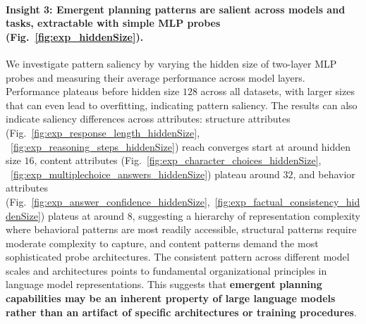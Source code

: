 \paragraph{Insight 3: Emergent planning patterns are salient across models and tasks, extractable with simple MLP probes (Fig.~\ref{fig:exp_hiddenSize}).}
We investigate pattern saliency by varying the hidden size of two-layer MLP probes and measuring their average performance across model layers. Performance plateaus before hidden size $128$ across all datasets, with larger sizes that can even lead to overfitting, indicating pattern saliency. 
The results can also indicate saliency differences across attributes: structure attributes (Fig.~\ref{fig:exp_response_length_hiddenSize}, ~\ref{fig:exp_reasoning_steps_hiddenSize}) reach converges start at around hidden size $16$, content attributes (Fig.~\ref{fig:exp_character_choices_hiddenSize}, ~\ref{fig:exp_multiplechoice_answers_hiddenSize}) plateau around $32$, and behavior attributes (Fig.~\ref{fig:exp_answer_confidence_hiddenSize},~\ref{fig:exp_factual_consistency_hiddenSize}) plateus at around 8, suggesting a hierarchy of representation complexity where behavioral patterns are most readily accessible, structural patterns require moderate complexity to capture, and content patterns demand the most sophisticated probe architectures.
The consistent pattern across different model scales and architectures points to fundamental organizational principles in language model representations. This suggests that \textbf{emergent planning capabilities may be an inherent property of large language models rather than an artifact of specific architectures or training procedures}.




